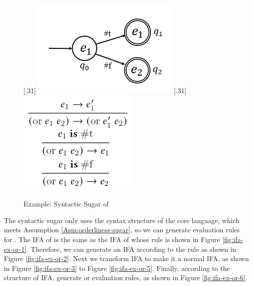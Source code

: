 \begin{example}
\begin{figure}[t]
{        }
        [.31\linewidth]{
            \includegraphics[scale=0.3]{images/ifa/ifa-ex-or-5.png}
        }
        [.31\linewidth]{
            \includegraphics[scale=0.3]{images/ifa/ifa-ex-or-6.png}
        }
        \caption{Example: Syntactic Sugar of }
        \label{fig:ifa-nand-std}
    \end{figure}

    The  syntactic sugar only uses the syntax structure of the core language, which meets Assumption \ref{Asm:orderliness-sugar}, so we can generate evaluation rules for .
    The IFA of  is the same as the IFA of  whose rule is shown in Figure \ref{fig:ifa-ex-or-1}. Therefore, we can generate an IFA according to the rule as shown in Figure \ref{fig:ifa-ex-or-2}. Next we transform IFA to make it a normal IFA, as shown in Figure \ref{fig:ifa-ex-or-3} to Figure \ref{fig:ifa-ex-or-5}. Finally, according to the structure of IFA, generate or evaluation rules, as shown in Figure \ref{fig:ifa-ex-or-6}.
    \myend
\end{example}


